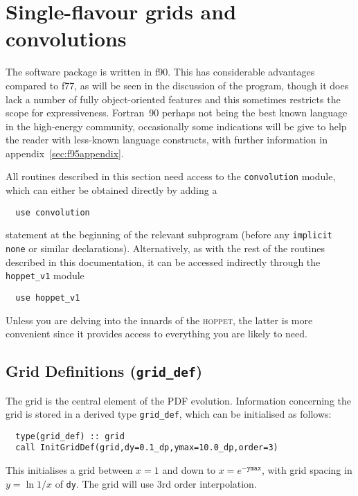 \documentclass[12pt]{article}
\newcommand{\hoppet}{\textsc{hoppet}\xspace}
\newcommand{\ttt}[1]{\texttt{#1}}
\begin{document}
\section{Single-flavour grids and convolutions}

The software package is written in f90. This has considerable
advantages compared to f77, as will be seen in the discussion of the
program, though it does lack a number of fully object-oriented
features and this sometimes restricts the scope for expressiveness.
Fortran~90 perhaps not being the best known language in the
high-energy community, occasionally some indications will be give to
help the reader with less-known language constructs, with further
information in appendix~\ref{sec:f95appendix}.

All routines described in this section need access to the
\texttt{convolution} module, which can either be obtained directly by
adding a 
\begin{verbatim}
  use convolution
\end{verbatim}
statement at the beginning of the relevant subprogram (before
any \ttt{implicit none} or similar declarations). Alternatively, as
with the rest of the routines described in this documentation, it can
be accessed indirectly through the \ttt{hoppet\_v1} module
\begin{verbatim}
  use hoppet_v1
\end{verbatim}
Unless you are delving into the innards of the \hoppet, the latter is
more convenient since it provides access to everything you are likely
to need.

\subsection{Grid Definitions (\texttt{grid\_def})}
\label{sec:grid}

The grid is the central element of the PDF evolution. Information
concerning the grid is stored in a derived type \texttt{grid\_def},
which can be initialised as follows:
\begin{verbatim}
  type(grid_def) :: grid
  call InitGridDef(grid,dy=0.1_dp,ymax=10.0_dp,order=3)
\end{verbatim}
This initialises a grid between $x=1$ and down to $x =
e^{-\texttt{ymax}}$, with grid spacing in $y = \ln 1/x$ of
\texttt{dy}. The grid will use 3rd order interpolation.
\end{document}
